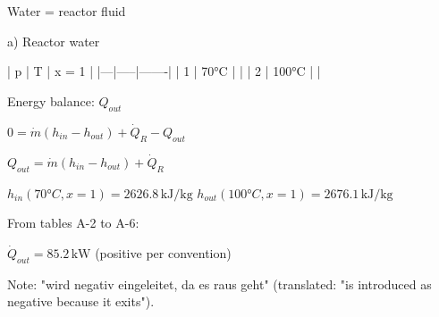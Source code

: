 Water = reactor fluid  

a) Reactor water  

| p | T   | x = 1 |  
|---|-----|-------|  
| 1 | 70°C |       |  
| 2 | 100°C |       |  

Energy balance:  
\( Q_{out} \)  

\( 0 = \dot{m} (h_{in} - h_{out}) + \dot{Q}_R - Q_{out} \)  

\( Q_{out} = \dot{m} (h_{in} - h_{out}) + \dot{Q}_R \)  

\( h_{in} (70°C, x = 1) = 2626.8 \, \text{kJ/kg} \)  
\( h_{out} (100°C, x = 1) = 2676.1 \, \text{kJ/kg} \)  

From tables A-2 to A-6:  

\( \dot{Q}_{out} = 85.2 \, \text{kW} \) (positive per convention)  

Note: "wird negativ eingeleitet, da es raus geht" (translated: "is introduced as negative because it exits").